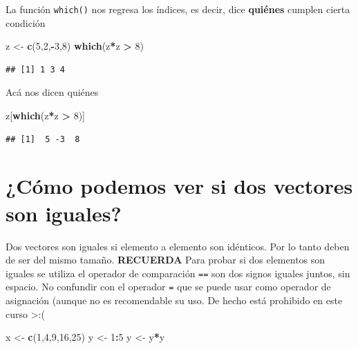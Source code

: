 \documentclass[
]{book}
\newenvironment{Shaded}{\begin{snugshade}}{\end{snugshade}}
\newcommand{\DecValTok}[1]{\textcolor[rgb]{0.00,0.00,0.81}{#1}}
\newcommand{\FunctionTok}[1]{\textcolor[rgb]{0.13,0.29,0.53}{\textbf{#1}}}
\newcommand{\NormalTok}[1]{#1}
\newcommand{\OtherTok}[1]{\textcolor[rgb]{0.56,0.35,0.01}{#1}}
\newcommand{\SpecialCharTok}[1]{\textcolor[rgb]{0.81,0.36,0.00}{\textbf{#1}}}
\begin{document}
La función \texttt{which()} nos regresa los índices, es decir, dice \textbf{quiénes} cumplen cierta condición

\begin{Shaded}
\begin{Highlighting}[]
\NormalTok{z }\OtherTok{\textless{}{-}} \FunctionTok{c}\NormalTok{(}\DecValTok{5}\NormalTok{,}\DecValTok{2}\NormalTok{,}\SpecialCharTok{{-}}\DecValTok{3}\NormalTok{,}\DecValTok{8}\NormalTok{)}
\FunctionTok{which}\NormalTok{(z}\SpecialCharTok{*}\NormalTok{z }\SpecialCharTok{\textgreater{}} \DecValTok{8}\NormalTok{)}
\end{Highlighting}
\end{Shaded}

\begin{verbatim}
## [1] 1 3 4
\end{verbatim}

Acá nos dicen quiénes

\begin{Shaded}
\begin{Highlighting}[]
\NormalTok{z[}\FunctionTok{which}\NormalTok{(z}\SpecialCharTok{*}\NormalTok{z }\SpecialCharTok{\textgreater{}} \DecValTok{8}\NormalTok{)]}
\end{Highlighting}
\end{Shaded}

\begin{verbatim}
## [1]  5 -3  8
\end{verbatim}

\section{¿Cómo podemos ver si dos vectores son iguales?}\label{cuxf3mo-podemos-ver-si-dos-vectores-son-iguales}

Dos vectores son iguales si elemento a elemento son idénticos.
Por lo tanto deben de ser del mismo tamaño.
\textbf{RECUERDA} Para probar si dos elementos son iguales se utiliza el operador de comparación \texttt{==} son dos signos iguales juntos, sin espacio.
No confundir con el operador \texttt{=} que se puede usar como operador de asignación (aunque no es recomendable su uso. De hecho está prohibido en este curso \textgreater:(

\begin{Shaded}
\begin{Highlighting}[]
\NormalTok{x }\OtherTok{\textless{}{-}} \FunctionTok{c}\NormalTok{(}\DecValTok{1}\NormalTok{,}\DecValTok{4}\NormalTok{,}\DecValTok{9}\NormalTok{,}\DecValTok{16}\NormalTok{,}\DecValTok{25}\NormalTok{)}
\NormalTok{y }\OtherTok{\textless{}{-}} \DecValTok{1}\SpecialCharTok{:}\DecValTok{5}
\NormalTok{y }\OtherTok{\textless{}{-}}\NormalTok{ y}\SpecialCharTok{*}\NormalTok{y}
\end{Highlighting}
\end{Shaded}
\end{document}
